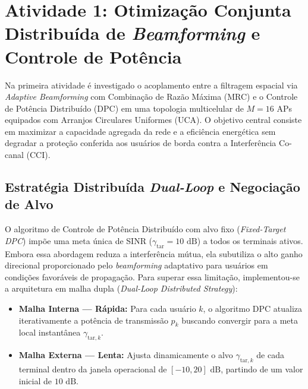 \newpage

\section{Atividade 1: Otimização Conjunta Distribuída de \textit{Beamforming} e Controle de Potência}

Na primeira atividade é investigado o acoplamento entre a filtragem espacial via \textit{Adaptive Beamforming} com Combinação de Razão Máxima (MRC) e o Controle de Potência Distribuído (DPC) em uma topologia multicelular de $M = 16$ APs equipados com Arranjos Circulares Uniformes (UCA). O objetivo central consiste em maximizar a capacidade agregada da rede e a eficiência energética sem degradar a proteção conferida aos usuários de borda contra a Interferência Co-canal (CCI).

\subsection{Estratégia Distribuída \textit{Dual-Loop} e Negociação de Alvo}

O algoritmo de Controle de Potência Distribuído com alvo fixo (\textit{Fixed-Target DPC}) impõe uma meta única de SINR ($\gamma_{\text{tar}} = 10\text{ dB}$) a todos os terminais ativos. Embora essa abordagem reduza a interferência mútua, ela subutiliza o alto ganho direcional proporcionado pelo \textit{beamforming} adaptativo para usuários em condições favoráveis de propagação. Para superar essa limitação, implementou-se a arquitetura em malha dupla (\textit{Dual-Loop Distributed Strategy}):

\begin{itemize}
    \item \textbf{Malha Interna — Rápida:} Para cada usuário $k$, o algoritmo DPC atualiza iterativamente a potência de transmissão $p_k$ buscando convergir para a meta local instantânea $\gamma_{\text{tar},k}$.
    \item \textbf{Malha Externa — Lenta:} Ajusta dinamicamente o alvo $\gamma_{\text{tar},k}$ de cada terminal dentro da janela operacional de $[-10, 20]\text{ dB}$, partindo de um valor inicial de $10\text{ dB}$.
\end{itemize}

